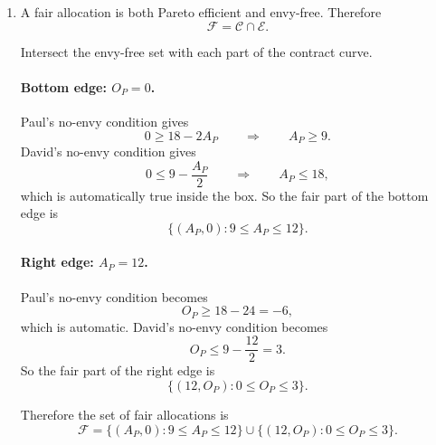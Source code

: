 \documentclass[12pt]{article}
\begin{document}
\begin{enumerate}[label=(\alph*)]
    A schematic figure is shown below.

    \begin{center}
    \end{center}

    \item
    A fair allocation is both Pareto efficient and envy-free. Therefore
    \[
    \mathcal F=\mathcal C\cap\mathcal E.
    \]

    Intersect the envy-free set with each part of the contract curve.

    \paragraph{Bottom edge: \(O_P=0\).}
    Paul's no-envy condition gives
    \[
    0\ge 18-2A_P
    \qquad\Longrightarrow\qquad
    A_P\ge 9.
    \]
    David's no-envy condition gives
    \[
    0\le 9-\frac{A_P}{2}
    \qquad\Longrightarrow\qquad
    A_P\le 18,
    \]
    which is automatically true inside the box. So the fair part of the bottom edge is
    \[
    \{(A_P,0): 9\le A_P\le 12\}.
    \]

    \paragraph{Right edge: \(A_P=12\).}
    Paul's no-envy condition becomes
    \[
    O_P\ge 18-24=-6,
    \]
    which is automatic. David's no-envy condition becomes
    \[
    O_P\le 9-\frac{12}{2}=3.
    \]
    So the fair part of the right edge is
    \[
    \{(12,O_P): 0\le O_P\le 3\}.
    \]

    Therefore the set of fair allocations is
    \[
    \boxed{
    \mathcal F
    =
    \{(A_P,0): 9\le A_P\le 12\}
    \cup
    \{(12,O_P): 0\le O_P\le 3\}.}
    \]
\end{enumerate}
\end{document}
